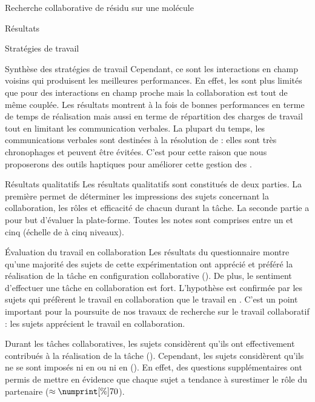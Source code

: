 \documentclass[myfrancais]{mythesis}
\begin{document}
\begin{mychapter}{Recherche collaborative de résidu sur une molécule}
\begin{mysection}{Résultats}
\begin{mysubsection}{Stratégies de travail}
\begin{mysubsubsection}{Synthèse des stratégies de travail}
					Cependant, ce sont les interactions en champ voisins qui produisent les meilleures performances.
					En effet, les  sont plus limités que pour des interactions en champ proche mais la collaboration est tout de même couplée.
					Les résultats montrent à la fois de bonnes performances en terme de temps de réalisation mais aussi en terme de répartition des charges de travail tout en limitant les communication verbales.
					La plupart du temps, les communications verbales sont destinées à la résolution de  : elles sont très chronophages et peuvent être évitées.
					C'est pour cette raison que nous proposerons des outils haptiques pour améliorer cette gestion des  .
				\end{mysubsubsection}
			\end{mysubsection}
			\begin{mysubsection}{Résultats qualitatifs}
				Les résultats qualitatifs sont constitués de deux parties.
				La première permet de déterminer les impressions des sujets concernant la collaboration, les rôles et efficacité de chacun durant la tâche.
				La seconde partie a pour but d'évaluer la plate-forme.
				Toutes les notes sont comprises entre un et cinq (échelle de  à cinq niveaux).
				\begin{mysubsubsection}{Évaluation du travail en collaboration}
					Les résultats du questionnaire montre qu'une majorité des sujets de cette expérimentation ont apprécié et préféré la réalisation de la tâche en configuration collaborative ().
					De plus, le sentiment d'effectuer une tâche en collaboration est fort.
					L'hypothèse  est confirmée par les sujets qui préfèrent le travail en collaboration que le travail en .
					C'est un point important pour la poursuite de nos travaux de recherche sur le travail collaboratif : les sujets apprécient le travail en collaboration.

					Durant les tâches collaboratives, les sujets considèrent qu'ils ont effectivement contribués à la réalisation de la tâche ().
					Cependant, les sujets considèrent qu'ils ne se sont imposés ni en  ou ni en  ().
					En effet, des questions supplémentaires ont permis de mettre en évidence que chaque sujet a tendance à surestimer le rôle du partenaire ($\approx\mynum[\%]{70}$).


\end{mysubsubsection}
\end{mysubsection}
\end{mysection}
\end{mychapter}
\end{document}
